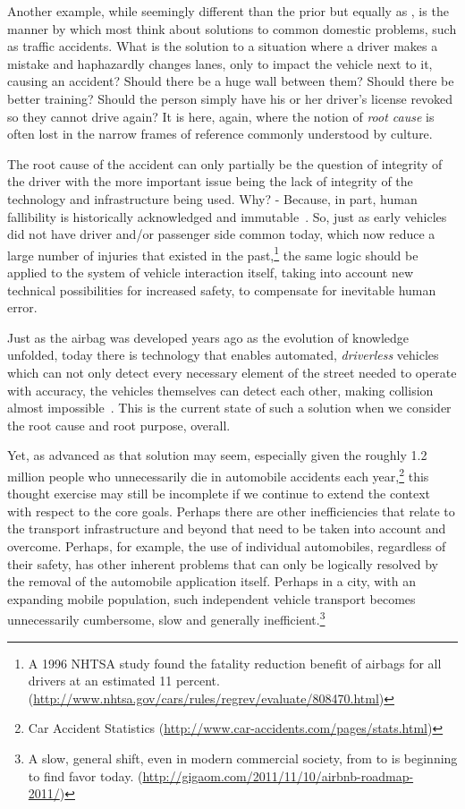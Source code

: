 \documentclass[10pt, a4paper, cleardoubleempty, openright, twoside]{book}
\begin{document}
Another example, while seemingly different than the prior but equally as
, is the manner by which most think about solutions
to common domestic problems, such as traffic accidents. What is the
solution to a situation where a driver makes a mistake and haphazardly
changes lanes, only to impact the vehicle next to it, causing an
accident? Should there be a huge wall between them? Should there be
better training? Should the person simply have his or her driver's
license revoked so they cannot drive again? It is here, again, where the
notion of \emph{root cause} is often lost in the narrow frames of
reference commonly understood by culture.

The root cause of the accident can only partially be the question of
integrity of the driver with the more important issue being the lack of
integrity of the technology and infrastructure being used. Why? -
Because, in part, human fallibility is historically acknowledged and
immutable~\cite{Reason:BMJ:00}. So, just as early vehicles did not have
driver and/or passenger side  common today, which now
reduce a large number of injuries that existed in the past,\footnote{
	A 1996 NHTSA study found the fatality reduction benefit of airbags for
	all drivers at an estimated 11 percent.
	(\url{http://www.nhtsa.gov/cars/rules/regrev/evaluate/808470.html})
} 
the same logic should be applied to the system of vehicle interaction
itself, taking into account new technical possibilities for increased
safety, to compensate for inevitable human error.

Just as the airbag was developed years ago as the evolution of knowledge
unfolded, today there is technology that enables automated,
\emph{driverless} vehicles which can not only detect every necessary
element of the street needed to operate with accuracy, the vehicles
themselves can detect each other, making collision almost
impossible~\cite{Rong:http:11}. This is the current state of such a
solution when we consider the root cause and root purpose, overall. 

Yet, as advanced as that solution may seem, especially given the roughly
1.2 million people who unnecessarily die in automobile accidents each
year,\footnote{
	Car Accident Statistics
	(\url{http://www.car-accidents.com/pages/stats.html})
} 
this thought exercise may still be incomplete if we continue to extend
the context with respect to the core goals. Perhaps there are other
inefficiencies that relate to the transport infrastructure and beyond
that need to be taken into account and overcome. Perhaps, for example,
the use of individual automobiles, regardless of their safety, has other
inherent problems that can only be logically resolved by the removal of
the automobile application itself. Perhaps in a city, with an expanding
mobile population, such independent vehicle transport becomes
unnecessarily cumbersome, slow and generally inefficient.\footnote{
	A slow, general shift, even in modern commercial society, from
	 to  is beginning to find favor
	today.  (\url{http://gigaom.com/2011/11/10/airbnb-roadmap-2011/})
}
\end{document}
